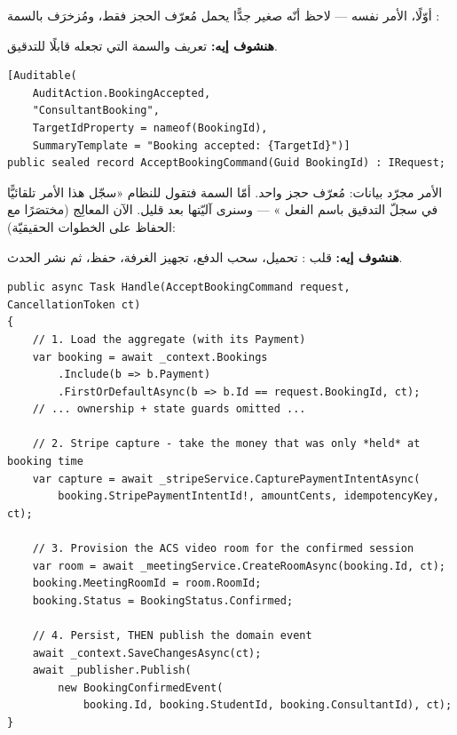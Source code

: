 أوّلًا، الأمر نفسه — لاحظ أنّه  صغير جدًّا يحمل مُعرّف الحجز فقط، ومُزخرَف
بالسمة \code{[Auditable]}:

\textbf{هنشوف إيه:} تعريف  والسمة التي تجعله قابلًا للتدقيق.

\begin{english}
\begin{lstlisting}[language={[Sharp]C}]
[Auditable(
    AuditAction.BookingAccepted,
    "ConsultantBooking",
    TargetIdProperty = nameof(BookingId),
    SummaryTemplate = "Booking accepted: {TargetId}")]
public sealed record AcceptBookingCommand(Guid BookingId) : IRequest;
\end{lstlisting}
\end{english}

الأمر مجرّد بيانات: مُعرّف حجز واحد. أمّا السمة \code{[Auditable]} فتقول للنظام «سجّل هذا
الأمر تلقائيًّا في سجلّ التدقيق باسم الفعل » — وسنرى آليّتها بعد قليل.
الآن المعالِج (مختصَرًا مع الحفاظ على الخطوات الحقيقيّة):

\textbf{هنشوف إيه:} قلب : تحميل، سحب الدفع، تجهيز الغرفة،
حفظ، ثم نشر الحدث.

\begin{english}
\begin{lstlisting}[language={[Sharp]C}]
public async Task Handle(AcceptBookingCommand request, CancellationToken ct)
{
    // 1. Load the aggregate (with its Payment)
    var booking = await _context.Bookings
        .Include(b => b.Payment)
        .FirstOrDefaultAsync(b => b.Id == request.BookingId, ct);
    // ... ownership + state guards omitted ...

    // 2. Stripe capture - take the money that was only *held* at booking time
    var capture = await _stripeService.CapturePaymentIntentAsync(
        booking.StripePaymentIntentId!, amountCents, idempotencyKey, ct);

    // 3. Provision the ACS video room for the confirmed session
    var room = await _meetingService.CreateRoomAsync(booking.Id, ct);
    booking.MeetingRoomId = room.RoomId;
    booking.Status = BookingStatus.Confirmed;

    // 4. Persist, THEN publish the domain event
    await _context.SaveChangesAsync(ct);
    await _publisher.Publish(
        new BookingConfirmedEvent(
            booking.Id, booking.StudentId, booking.ConsultantId), ct);
}
\end{lstlisting}
\end{english}

